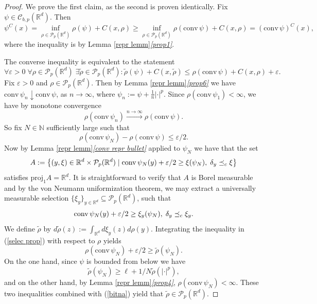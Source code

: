 \documentclass[10pt,a4paper]{amsart}
\newcommand{\PP}{\mathcal{P}}
\newcommand{\R}{\mathbb R}
\newcommand{\conv}{\mathrm{conv}\,}
\newcommand{\lc}{\preceq_{\textnormal{c}}}
\begin{document}
\begin{proof} We prove the first claim, as the second is proven identically.
    Fix $\psi\in{\mathcal{C}}_{b,p}(\R^d)$. Then
    $$ \psi^C(x)=\inf_{\rho\in\PP_p(\R^d)} \rho(\psi)+C(x,\rho)\geq \inf_{\rho\in\PP_p(\R^d)} \rho(\conv\psi)+C(x,\rho)=(\conv{\psi})^C(x),$$
    where the inequality is by Lemma \ref{repr lemm}\textit{\ref{prop1}}. 
    
    The converse inequality is equivalent to the statement
   \begin{equation} \label{nejjed}
        \forall\varepsilon>0\; \forall\rho\in\PP_p(\R^d) \;\exists\widetilde{\rho}\in\PP_p(\R^d):\widetilde{\rho}(\psi)+C(x,\widetilde{\rho})\leq {\rho}(\conv{\psi})+C(x,\rho)+\varepsilon.
   \end{equation}
    Fix $\varepsilon>0$ and $\rho\in\PP_p(\R^d).$ Then by Lemma \ref{repr lemm}\textit{\ref{prop6}} we have
    $\conv{\psi_n}\downarrow \conv{\psi}$, as $n\to\infty$, where $\psi_n:=\psi+\frac{1}{n}|\cdot|^p$. Since $\rho(\conv{\psi_1})<\infty$, we have by monotone convergence 
    $$\rho(\conv{\psi_n})\xrightarrow{n\to\infty}\rho(\conv{\psi}).$$
    So fix $N\in\mathbb N$ sufficiently large such that
   \begin{equation} \label{suff small}
        \rho(\conv{\psi_N})-\rho(\conv \psi)\leq \varepsilon/2.
   \end{equation}
    Now by Lemma \ref{repr lemm}\textit{\ref{conv repr bullet}} applied to $\psi_N$ we have that the set 
    $$A:=\left\{(y,\xi)\in \R^d\times\PP_p(\R^d) \mid \conv{\psi_N}(y)+\varepsilon/2\geq \xi(\psi_N), \;\delta_y \lc\xi\right\}$$
    satisfies $\text{proj}_1A=\R^d$. It is straightforward to verify that $A$ is Borel measurable and by the von Neumann uniformization theorem, we may extract a universally measurable selection $\{\xi_y\}_{y\in \R^d}\subseteq\PP_p(\R^d)$, such that
    \begin{equation} \label{selec prop}
        \conv{\psi_N}(y)+\varepsilon/2\geq \xi_y(\psi_N), \;\delta_y \lc\xi_y.
    \end{equation}
   We define $\widetilde{\rho}$ by $d\widetilde{\rho}(z):=\int_{\R^d} d\xi_y(z)d\rho(y).$ Integrating the inequality in (\ref{selec prop}) with respect to $\rho$ yields
   \begin{equation} \label{bitna}
       \rho(\conv{\psi_N})+\varepsilon/2\geq \widetilde{\rho}(\psi_N).
   \end{equation}
   On the one hand, since $\psi$ is bounded from below we have
$$\widetilde{\rho}(\psi_N)\geq \ell +1/N\widetilde{\rho}(|\cdot|^p),$$
and on the other hand, by Lemma \ref{repr lemm}\textit{\ref{prop4}}, 
$\rho(\conv{\psi_N}) <\infty.$
These two inequalities combined with (\ref{bitna}) yield that $\widetilde{\rho}\in\PP_p(\R^d)$.


\end{proof}
\end{document}
